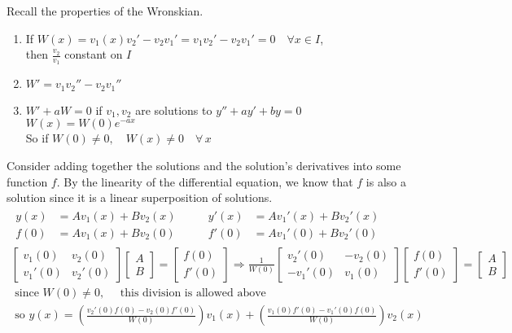\documentclass[twoside]{amsart}
\theoremstyle{plain}
\theoremstyle{definition}
\newcommand{\exercisehead}[1]
  {\smallskip
   \noindent{\small\bf Exercise #1.}}
\begin{document}
\exercisehead{23} Recall the properties of the Wronskian.  
\begin{enumerate}
\item If $W(x) = v_1(x)v_2' - v_2 v_1' = v_1 v_2' - v_2 v_1' = 0 \quad \forall x \in I$, \\
  \phantom{ If } then $\frac{v_2}{v_1}$ constant on $I$ 
\item $W' = v_1 v_2'' - v_2 v_1'' $ 
\item $W' + a W = 0 $ if $v_1, v_2$ are solutions to $y'' + ay' + by = 0$ \\
  $W(x) = W(0) e^{-ax} $ \\
  So if $W(0) \neq 0 , \quad W(x) \neq 0 \quad \forall \, x$
\end{enumerate}
Consider adding together the solutions and the solution's derivatives into some function $f$.  By the linearity of the differential equation, we know that $f$ is also a solution since it is a linear superposition of solutions.  
\[
\begin{gathered}
  \begin{aligned}
    y(x) & = A v_1(x) + B v_2(x) \\
    f(0) & = A v_1(x) + B v_2(0) 
\end{aligned} \quad \quad 
\begin{aligned}
  y'(x) & = Av_1'(x) + Bv_2'(x) \\
  f'(0) & = Av_1'(0) + Bv_2'(0)
\end{aligned} \\
\left[ \begin{matrix} v_1(0) & v_2(0) \\ v_1'(0) & v_2'(0) \end{matrix} \right]\left[ \begin{matrix} A \\ B \end{matrix} \right] = \left[ \begin{matrix} f(0) \\ f'(0) \end{matrix} \right] \Longrightarrow \frac{1}{ W(0)} \left[ \begin{matrix} v_2'(0) & - v_2(0) \\ -v_1'(0) & v_1(0) \end{matrix} \right] \left[ \begin{matrix} f(0) \\ f'(0) \end{matrix} \right] = \left[ \begin{matrix} A \\ B \end{matrix} \right] \\
\text{ since } W(0) \neq 0 , \quad \text{ this division is allowed above }\\
\text{ so } \boxed{ y(x) = \left( \frac{ v_2'(0) f(0) - v_2(0)f'(0) }{ W(0)} \right) v_1(x) + \left( \frac{ v_1(0) f'(0) - v_1'(0) f(0) }{ W(0) } \right) v_2(x) }
\end{gathered}
\]
\end{document}
